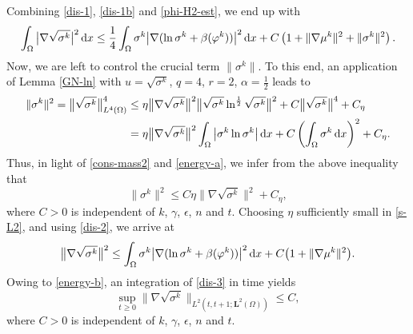 \documentclass[11pt,reqno]{amsart}
\def\d{{\rm d}}
\begin{document}
Combining \eqref{dis-1}, \eqref{dis-1b} and \eqref{phi-H2-est}, we end up with
%
\begin{equation}
\label{dis-2}
\begin{split}
\int_\Omega  \big|\nabla \sqrt{\sigma^k}\big|^2 \, \d x
\leq \frac14\int_\Omega \sigma^k \big| \nabla (\ln \sigma^k+\beta(\varphi^k))\big|^2 \, \d x
+ C\left(1+\| \nabla \mu^k\|^2 + \|\sigma^k\|^2\right).
\end{split}
\end{equation}
%
Now, we are left to control the crucial term $\|\sigma^k\|$. To this end, an application of Lemma \ref{GN-ln} with $u=\sqrt{\sigma^k}$, $q=4$, $r=2$, $\alpha=\frac12$ leads to
%
\begin{align}
\| \sigma^k\|^2
= \big\| \sqrt{\sigma^k}\big\|_{L^4(\Omega)}^4
&\leq \eta \big\| \nabla \sqrt{\sigma^k}\big\|^{2}
\big\| \sqrt{\sigma^k} \ln^\frac12 \sqrt{\sigma^k}\big\|^2
+C \big\|  \sqrt{\sigma^k} \big\|^4 +C_\eta
\notag \\
&= \eta \big\| \nabla \sqrt{\sigma^k}\big\|^{2}
\int_{\Omega} \big|\sigma^k \ln \sigma^k\big| \, \d x
+C \left( \int_{\Omega} \sigma^k \, \d x \right)^2 +C_\eta.
\notag
\end{align}
%
Thus, in light of \eqref{cons-mass2} and \eqref{energy-a}, we infer from the above inequality that
%
\begin{equation}
\label{s-L2}
\| \sigma^k\|^2
\leq C\eta \big\| \nabla \sqrt{\sigma^k}\big\|^{2}
+ C_\eta,
\end{equation}
%
where $C>0$ is independent of $k$, $\gamma$, $\epsilon$, $n$ and $t$. Choosing $\eta$ sufficiently small in \eqref{s-L2}, and using \eqref{dis-2}, we arrive at
%
\begin{equation}
\label{dis-3}
\begin{split}
\big\|\nabla \sqrt{\sigma^k}\big\|^2
\leq \int_\Omega \sigma^k \big| \nabla (\ln \sigma^k+\beta(\varphi^k))\big|^2 \, \d x
+ C \big(1+ \|\nabla \mu^k\|^2\big).
\end{split}
\end{equation}
%
Owing to \eqref{energy-b}, an integration of \eqref{dis-3} in time yields
%
\begin{equation}
\label{dis-4}
\sup_{t\geq 0}\big\| \nabla \sqrt{\sigma^k} \big\|_{L^2(t,t+1; \bm{L}^2(\Omega))}
\leq C,
\end{equation}
%
where $C>0$ is independent of $k$, $\gamma$, $\epsilon$, $n$ and $t$.
\end{document}
